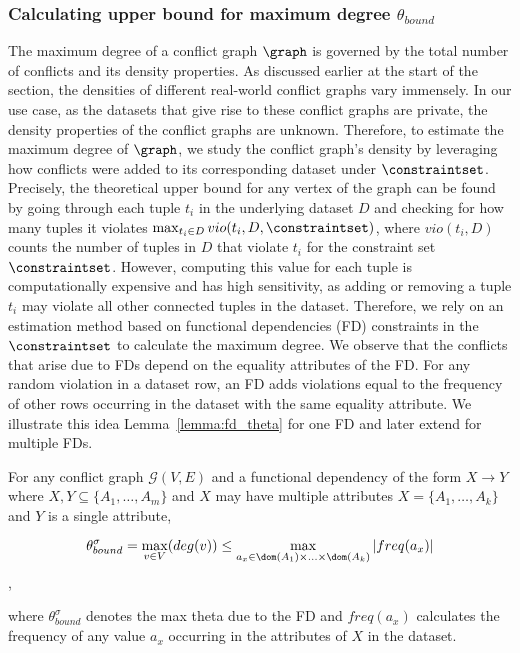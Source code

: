 \subsubsection{Calculating upper bound for maximum degree $\theta_{bound}$}\label{sec:dc_aware_ub}
The maximum degree of a conflict graph $\graph$ is governed by the total number of conflicts and its density properties. As discussed earlier at the start of the section, the densities of different real-world conflict graphs vary immensely. In our use case, as the datasets that give rise to these conflict graphs are private, the density properties of the conflict graphs are unknown. Therefore, to estimate the maximum degree of $\graph$, we study the conflict graph's density by leveraging how conflicts were added to its corresponding dataset under $\constraintset$. Precisely, the theoretical upper bound for any vertex of the graph can be found by going through each tuple $t_i$ in the underlying dataset $D$ and checking for how many tuples it violates $\max_{t_i \in D} vio(t_i, D, \constraintset)$, where $vio(t_i, D)$ counts the number of tuples in $D$ that violate $t_i$ for the constraint set $\constraintset$. However, computing this value for each tuple is computationally expensive and has high sensitivity, as adding or removing a tuple $t_i$ may violate all other connected tuples in the dataset.  Therefore, we rely on an estimation method based on functional dependencies (FD) constraints in the $\constraintset$ to calculate the maximum degree. We observe that the conflicts that arise due to FDs depend on the equality attributes of the FD. For any random violation in a dataset row, an FD adds violations equal to the frequency of other rows occurring in the dataset with the same equality attribute. We illustrate this idea Lemma~\ref{lemma:fd_theta} for one FD and later extend for multiple FDs.  


\begin{lemma}\label{lemma:fd_theta}
    For any conflict graph $\mathcal{G} (V,E)$ and a functional dependency of the form $X \rightarrow Y$ where $X,Y\subseteq\{A_1,\dots,A_m\}$ and $X$ may have multiple attributes $X = \{A_1,\dots,A_k\}$ and $Y$ is a single attribute,
    
    $$ \theta_{bound}^\sigma = \max_{v \in V}(deg(v)) 
    \leq  \max_{a_x \in \dom(A_1) \times \ldots \times \dom(A_k) } |freq(a_x)|$$,
    
     where $\theta_{bound}^\sigma$ denotes the max theta due to the FD and $freq(a_x)$ calculates the frequency of any value $a_x$ occurring in the attributes of $X$ in the dataset. 
\end{lemma}

